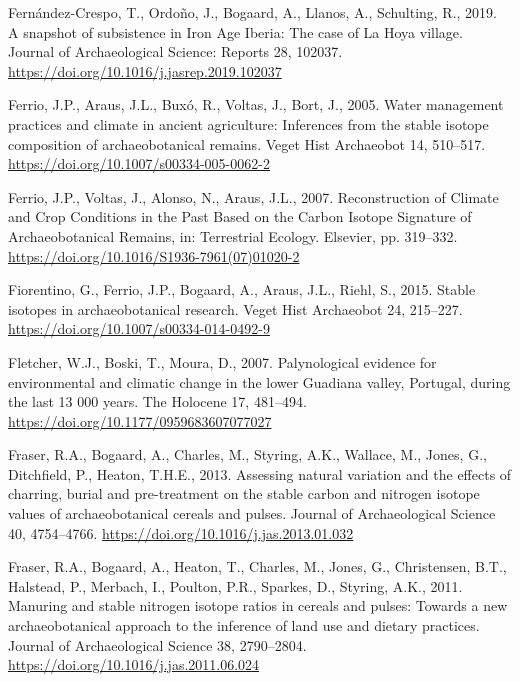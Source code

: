 \documentclass[preprint, 3p, authoryear]{elsarticle} %
\newlength{\cslhangindent}
\newlength{\cslentryspacingunit} %
\newenvironment{CSLReferences}[2] %
 {%
  \setlength{\parindent}{0pt}
  \ifodd #1
  \let\oldpar\par
  \def\par{\hangindent=\cslhangindent\oldpar}
  \fi
  \setlength{\parskip}{#2\cslentryspacingunit}
 }%
 {}
\begin{document}
\begin{CSLReferences}{1}{0}
\leavevmode{}%
Fernández-Crespo, T., Ordoño, J., Bogaard, A., Llanos, A., Schulting, R., 2019. A snapshot of subsistence in {Iron Age Iberia}: {The} case of {La Hoya} village. Journal of Archaeological Science: Reports 28, 102037. \url{https://doi.org/10.1016/j.jasrep.2019.102037}

\leavevmode{}%
Ferrio, J.P., Araus, J.L., Buxó, R., Voltas, J., Bort, J., 2005. Water management practices and climate in ancient agriculture: Inferences from the stable isotope composition of archaeobotanical remains. Veget Hist Archaeobot 14, 510--517. \url{https://doi.org/10.1007/s00334-005-0062-2}

\leavevmode{}%
Ferrio, J.P., Voltas, J., Alonso, N., Araus, J.L., 2007. Reconstruction of {Climate} and {Crop Conditions} in the {Past Based} on the {Carbon Isotope Signature} of {Archaeobotanical Remains}, in: Terrestrial {Ecology}. {Elsevier}, pp. 319--332. \url{https://doi.org/10.1016/S1936-7961(07)01020-2}

\leavevmode{}%
Fiorentino, G., Ferrio, J.P., Bogaard, A., Araus, J.L., Riehl, S., 2015. Stable isotopes in archaeobotanical research. Veget Hist Archaeobot 24, 215--227. \url{https://doi.org/10.1007/s00334-014-0492-9}

\leavevmode{}%
Fletcher, W.J., Boski, T., Moura, D., 2007. Palynological evidence for environmental and climatic change in the lower {Guadiana} valley, {Portugal}, during the last 13 000 years. The Holocene 17, 481--494. \url{https://doi.org/10.1177/0959683607077027}

\leavevmode{}%
Fraser, R.A., Bogaard, A., Charles, M., Styring, A.K., Wallace, M., Jones, G., Ditchfield, P., Heaton, T.H.E., 2013. Assessing natural variation and the effects of charring, burial and pre-treatment on the stable carbon and nitrogen isotope values of archaeobotanical cereals and pulses. Journal of Archaeological Science 40, 4754--4766. \url{https://doi.org/10.1016/j.jas.2013.01.032}

\leavevmode{}%
Fraser, R.A., Bogaard, A., Heaton, T., Charles, M., Jones, G., Christensen, B.T., Halstead, P., Merbach, I., Poulton, P.R., Sparkes, D., Styring, A.K., 2011. Manuring and stable nitrogen isotope ratios in cereals and pulses: Towards a new archaeobotanical approach to the inference of land use and dietary practices. Journal of Archaeological Science 38, 2790--2804. \url{https://doi.org/10.1016/j.jas.2011.06.024}


\end{CSLReferences}
\end{document}
